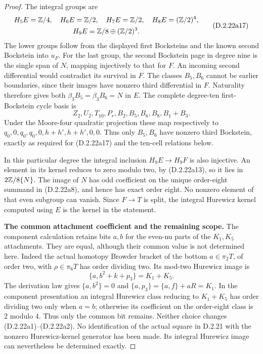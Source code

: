 \begin{proof}
The integral groups are
\[
\begin{gathered}
 H_5E=\mathbb Z/4,\quad H_6E=\mathbb Z/2,\quad H_7E=\mathbb Z/2,
 \quad H_8E=(\mathbb Z/2)^4,\\
 H_9E=\mathbb Z/8\oplus(\mathbb Z/2)^3.
\end{gathered}
\tag{D.2.22a17}
\]
The lower groups follow from the displayed first Bocksteins and
the known second Bockstein into $u_F$.
For the last group, the second Bockstein page in degree nine
is the single span of $N$, mapping injectively to that for $F$.
An incoming second differential would contradict its survival
in $F$. The classes $B_5,B_6$ cannot be earlier boundaries,
since their images have nonzero third differential in $F$.
Naturality therefore gives both
$\beta_3B_5=\beta_3B_6=N$ in $E$.
The complete degree-ten first-Bockstein cycle basis is
\[
 Z_2,U_2,T_{10},P_r,B_2,B_5,B_6,B_8,B_1+B_3.
\]
Under the Moore-four quadratic projection these map respectively
to $q_0,0,q_0,q_0,0,h+h',h+h',0,0$.
Thus only $B_5,B_6$ have nonzero third Bockstein, exactly as
required for \textup{(D.2.22a17)} and the ten-cell relations below.

In this particular degree the integral inclusion $H_9E\to H_9F$
is also injective. An element in its kernel reduces to zero modulo
two, by \textup{(D.2.22a13)}, so it lies in $2\mathbb Z/8\{N\}$.
The image of $N$ has odd coefficient on the unique order-eight
summand in \textup{(D.2.22a8)}, and hence has exact order eight.
No nonzero element of that even subgroup can vanish. Since
$F\to T$ is split, the integral Hurewicz kernel computed using
$E$ is the kernel in the statement.



\medskip\noindent
\textbf{The common attachment coefficient and the remaining scope.}
The component calculation retains bits $a,b$ for the even-nu
parts of the $K_1,K_5$ attachments. They are equal, although
their common value is not determined here.
Indeed the actual homotopy Browder bracket of the bottom
$a\in\pi_2T$, of order two, with $\rho\in\pi_6T$ has order
dividing two. Its mod-two Hurewicz image is
\[
 \{a,b^2+k+p_3\}=K_1+K_5.
\]
The derivation law gives $\{a,b^2\}=0$ and
$\{a,p_3\}=\{a,f\}+aR=K_1$.
In the component presentation an integral Hurewicz class reducing
to $K_1+K_5$ has order dividing two only when $a=b$;
otherwise its coefficient on the order-eight class is $2$ modulo
$4$. Thus only the common bit remains. Neither choice changes
\textup{(D.2.22a1)--(D.2.22a2)}.
No identification of the actual square in \textup{D.2.21} with
the nonzero Hurewicz-kernel generator has been made. Its integral
Hurewicz image can nevertheless be determined exactly.


\end{proof}
